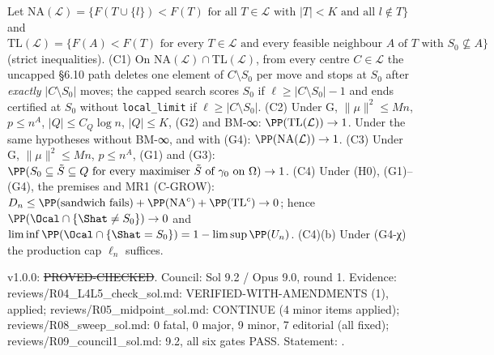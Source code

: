 \begin{theorem}[GROW]\label{reg:C-GROW_Thm-GROW}
Let $\mathrm{NA}(\mathcal L)=\{F(T\cup\{l\})<F(T)\text{ for all }T\in\mathcal L\text{ with }|T|<K\text{ and all }l\notin T\}$ and $\mathrm{TL}(\mathcal L)=\{F(A)<F(T)\text{ for every }T\in\mathcal L\text{ and every feasible neighbour }A\text{ of }T\text{ with }S_0\not\subseteq A\}$ (strict inequalities). (C1) On NA$(\mathcal L)\cap$TL$(\mathcal L)$, from every centre $C\in\mathcal L$ the uncapped §6.10 path deletes one element of $C\setminus S_0$ per move and stops at $S_0$ after \emph{exactly} $|C\setminus S_0|$ moves; the capped search scores $S_0$ if $\ell\ge|C\setminus S_0|-1$ and ends certified at $S_0$ without \texttt{local\_limit} if $\ell\ge|C\setminus S_0|$. (C2) Under G, $\|\mu\|^2\le Mn$, $p\le n^A$, $|Q|\le C_Q\log n$, $|Q|\le K$, (G2) and BM-∞: $\PP(\mathrm{TL}(\mathcal L))\to1$. Under the same hypotheses without BM-∞, and with (G4): $\PP(\mathrm{NA}(\mathcal L))\to1$. (C3) Under G, $\|\mu\|^2\le Mn$, $p\le n^A$, (G1) and (G3): $\PP(S_0\subseteq\tilde{S}\subseteq Q\text{ for every maximiser }\tilde{S}\text{ of }\gamma_0\text{ on }\Omega)\to1$. (C4) Under (H0), (G1)--(G4), the premises and MR1 (C-GROW): $D_n\le\PP(\text{sandwich fails})+\PP(\mathrm{NA}^c)+\PP(\mathrm{TL}^c)\to0$; hence $\PP(\Ocal\cap\{\Shat\ne S_0\})\to0$ and $\liminf\PP(\Ocal\cap\{\Shat=S_0\})=1-\limsup\PP(U_n)$. (C4)(b) Under (G4-χ) the production cap $\ell_n$ suffices.
\end{theorem}
\begin{statusbox}
 v1.0.0: \st{PROVED-CHECKED}. Council: Sol 9.2 / Opus 9.0, round 1. Evidence: reviews/R04\_L4L5\_check\_sol.md: VERIFIED-WITH-AMENDMENTS (1), applied; reviews/R05\_midpoint\_sol.md: CONTINUE (4 minor items applied); reviews/R08\_sweep\_sol.md: 0 fatal, 0 major, 9 minor, 7 editorial (all fixed); reviews/R09\_council1\_sol.md: 9.2, all six gates PASS. Statement: .
\end{statusbox}
